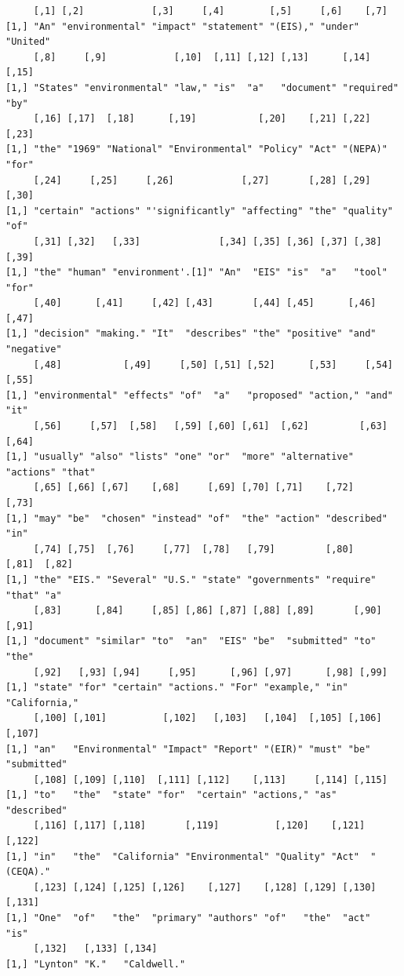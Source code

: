 \documentclass[
  letterpaper,
]{book}
\begin{document}
\begin{verbatim}
     [,1] [,2]            [,3]     [,4]        [,5]     [,6]    [,7]    
[1,] "An" "environmental" "impact" "statement" "(EIS)," "under" "United"
     [,8]     [,9]            [,10]  [,11] [,12] [,13]      [,14]      [,15]
[1,] "States" "environmental" "law," "is"  "a"   "document" "required" "by" 
     [,16] [,17]  [,18]      [,19]           [,20]    [,21] [,22]    [,23]
[1,] "the" "1969" "National" "Environmental" "Policy" "Act" "(NEPA)" "for"
     [,24]     [,25]     [,26]            [,27]       [,28] [,29]     [,30]
[1,] "certain" "actions" "'significantly" "affecting" "the" "quality" "of" 
     [,31] [,32]   [,33]              [,34] [,35] [,36] [,37] [,38]  [,39]
[1,] "the" "human" "environment'.[1]" "An"  "EIS" "is"  "a"   "tool" "for"
     [,40]      [,41]     [,42] [,43]       [,44] [,45]      [,46] [,47]     
[1,] "decision" "making." "It"  "describes" "the" "positive" "and" "negative"
     [,48]           [,49]     [,50] [,51] [,52]      [,53]     [,54] [,55]
[1,] "environmental" "effects" "of"  "a"   "proposed" "action," "and" "it" 
     [,56]     [,57]  [,58]   [,59] [,60] [,61]  [,62]         [,63]     [,64] 
[1,] "usually" "also" "lists" "one" "or"  "more" "alternative" "actions" "that"
     [,65] [,66] [,67]    [,68]     [,69] [,70] [,71]    [,72]       [,73]
[1,] "may" "be"  "chosen" "instead" "of"  "the" "action" "described" "in" 
     [,74] [,75]  [,76]     [,77]  [,78]   [,79]         [,80]     [,81]  [,82]
[1,] "the" "EIS." "Several" "U.S." "state" "governments" "require" "that" "a"  
     [,83]      [,84]     [,85] [,86] [,87] [,88] [,89]       [,90] [,91]
[1,] "document" "similar" "to"  "an"  "EIS" "be"  "submitted" "to"  "the"
     [,92]   [,93] [,94]     [,95]      [,96] [,97]      [,98] [,99]        
[1,] "state" "for" "certain" "actions." "For" "example," "in"  "California,"
     [,100] [,101]          [,102]   [,103]   [,104]  [,105] [,106] [,107]     
[1,] "an"   "Environmental" "Impact" "Report" "(EIR)" "must" "be"   "submitted"
     [,108] [,109] [,110]  [,111] [,112]    [,113]     [,114] [,115]     
[1,] "to"   "the"  "state" "for"  "certain" "actions," "as"   "described"
     [,116] [,117] [,118]       [,119]          [,120]    [,121] [,122]   
[1,] "in"   "the"  "California" "Environmental" "Quality" "Act"  "(CEQA)."
     [,123] [,124] [,125] [,126]    [,127]    [,128] [,129] [,130] [,131]
[1,] "One"  "of"   "the"  "primary" "authors" "of"   "the"  "act"  "is"  
     [,132]   [,133] [,134]     
[1,] "Lynton" "K."   "Caldwell."
\end{verbatim}
\end{document}
